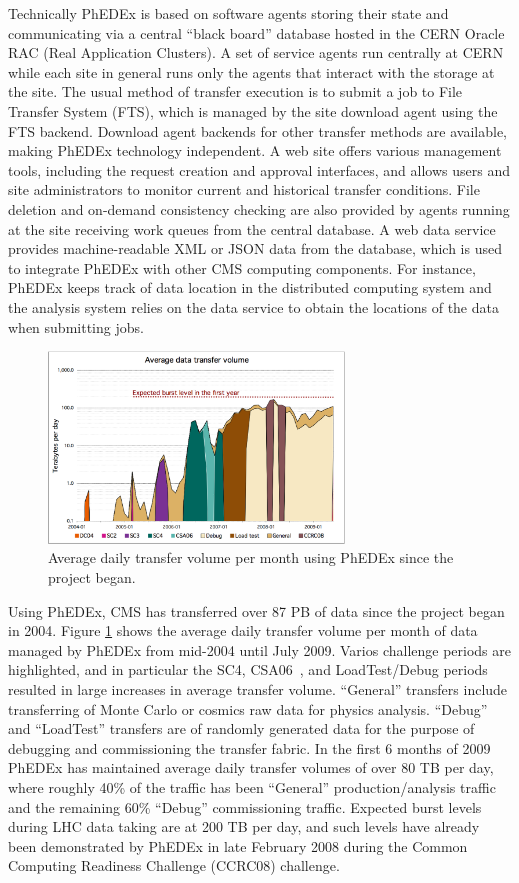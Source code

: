 Technically PhEDEx is based on software agents storing their state and
communicating via a central ``black board'' database hosted in the
CERN Oracle RAC (Real Application Clusters). A set of service agents
run centrally at CERN while each site in general runs
only the agents that interact with the storage at the site. The usual
method of transfer execution is to submit a job to File Transfer System (FTS), 
which is managed by the site download agent using the FTS backend.  Download
agent backends for other transfer methods are available, making PhEDEx
technology independent. A web site offers various management tools,
including the request creation and approval interfaces, and allows
users and site administrators to monitor current and historical
transfer conditions.  File deletion and on-demand consistency checking
are also provided by agents running at the site receiving work queues
from the central database.  A web data service provides
machine-readable XML or JSON data from the database, which is used to
integrate PhEDEx with other CMS computing components.  For instance,
PhEDEx keeps track of data location in the distributed computing
system and the analysis system relies on the data service to obtain
the locations of the data when submitting jobs.

\begin{figure}
 \includegraphics[width=0.70\textwidth]{phedex-avg-monthly-volume.eps}
\caption{Average daily transfer volume per month using PhEDEx since the project began.}
\label{fig:phedex-transfers}
\end{figure}

Using PhEDEx, CMS has transferred over 87 PB of data since the project 
began in 2004.  Figure \ref{fig:phedex-transfers} shows the average
daily transfer volume per month of data managed by PhEDEx from
mid-2004 until July 2009.  Varios challenge periods are highlighted,
and in particular the SC4, CSA06~\cite{RefPastExp}, and LoadTest/Debug periods resulted
in large increases in average transfer volume.  ``General'' transfers
include transferring of Monte Carlo or cosmics raw data for physics
analysis.  ``Debug'' and ``LoadTest'' transfers are of randomly
generated data for the purpose of debugging and commissioning the
transfer fabric.  In the first 6 months of 2009 PhEDEx has maintained
average daily transfer volumes of over 80 TB per day, where roughly
40\% of the traffic has been ``General'' production/analysis traffic
and the remaining 60\% ``Debug'' commissioning traffic.  Expected
burst levels during LHC data taking are at 200 TB per day, and such
levels have already been demonstrated by PhEDEx in late February 2008
during the Common Computing Readiness Challenge (CCRC08) challenge.

